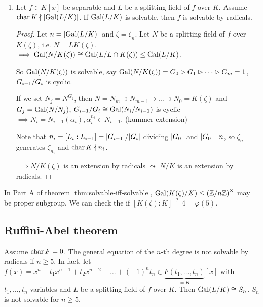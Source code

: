 \begin{theorem}
\begin{enumerate}[label={\bf Part \Alph*:}]
  \item Let $f \in K[x]$ be separable and $L$ be a splitting field of $f$ over $K$.
  Assume $\operatorname{char} K \nmid \lvert\operatorname{Gal}(L/K)\rvert$. If $\operatorname{Gal}(L/K)$ is solvable, then
  $f$ is solvable by radicals.

  \begin{proof}
    Let $n = \lvert\operatorname{Gal}(L/K)\rvert$ and $\zeta = \zeta_n$.
    Let $N$ be a splitting field of $f$ over $K(\zeta)$, i.e. $N = LK(\zeta)$.
    $\implies \operatorname{Gal}(N/K(\zeta)) \cong \operatorname{Gal}(L/L\cap K(\zeta)) \le \operatorname{Gal}(L/K)$.

    So $\operatorname{Gal}(N/K(\zeta))$ is solvable, say $\operatorname{Gal}(N/K(\zeta)) = G_0 \rhd G_1
    \rhd \dots \rhd G_m = 1$, ${G_{i-1}}/{G_i}$ is cyclic.
    
    If we set $N_j = N^{G_j}$, then
    $N = N_m \supset N_{m-1} \supset \dots \supset N_0 = K(\zeta)$ and
    $G_j = \operatorname{Gal}(N/N_j)$, ${G_{i-1}}/{G_i} \cong \operatorname{Gal}(N_i/N_{i-1})$ is
    cyclic $\implies N_i = N_{i-1}(\alpha_i), \alpha_i^{n_i} \in N_{i-1}$.
    (kummer extension)
    \begin{mdframed}
      Note that $n_i = [L_i : L_{i-1}] = \lvert G_{i-1}\rvert / \lvert G_i\rvert$ dividing
      $\lvert G_0\rvert$ and $\lvert G_0\rvert \mid n$, so $\zeta_n$ generates $\zeta_{n_i}$
      and $\operatorname{char} K \nmid n_i$.
    \end{mdframed}
    $\implies N/K(\zeta)$ is an extension by radicals $\leadsto$
    $N/K$ is an extension by radicals.
  \end{proof}
\end{enumerate}
\end{theorem}

\begin{remark}
  In Part A of theorem \ref{thm:solvable-iff-solvable},
  $\operatorname{Gal}(K(\zeta)/K) \le \left({\mathbb{Z}}/{n\mathbb{Z}}\right)^\times$ may be proper
  subgroup. We can check the if $[K(\zeta) : K] \overset{?}{=} 4 = \varphi(5)$.
\end{remark}

\subsection{Ruffini-Abel theorem}

\begin{theorem}
  Assume $\operatorname{char} F = 0$.
  The general equation of the $n$-th degree is not solvable by radicals if
  $n \ge 5$. In fact, let $f(x) = x^n - t_1x^{n-1} + t_2 x^{n-2} - \dots +
  (-1)^nt_n \in \underbrace{F(t_1, \dots, t_n)}_{=K}[x]$ with
  $t_1, \dots, t_n$ variables and $L$ be a splitting field of $f$ over $K$.
  Then $\operatorname{Gal}(L/K) \cong S_n$. $S_n$ is not solvable for $n \ge 5$.
\end{theorem}

